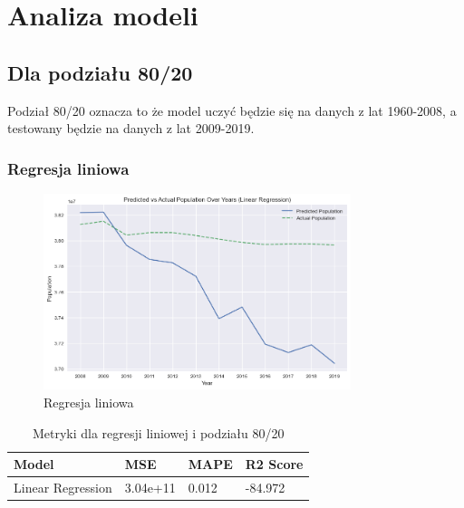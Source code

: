 \documentclass[11pt]{article}
\begin{document}
\section{Analiza modeli}
\subsection*{Dla podziału 80/20}
Podział 80/20 oznacza to że model uczyć będzie się na danych z lat 1960-2008, a testowany będzie na danych z lat 2009-2019.
\subsubsection*{Regresja liniowa}
\begin{figure}[H]
        \centering
        \includegraphics[width=0.8\textwidth]{images/linear.png}
        \caption{Regresja liniowa}
\end{figure}
\begin{table}[H]
        \centering
        \begin{tabular}{|l|l|l|l|}
        \hline
        Model & MSE & MAPE & R2 Score \\ \hline
        Linear Regression & 3.04e+11 & 0.012 & -84.972 \\ \hline
        \end{tabular}
        \caption{Metryki dla regresji liniowej i podziału 80/20}
        \end{table}
\end{document}
